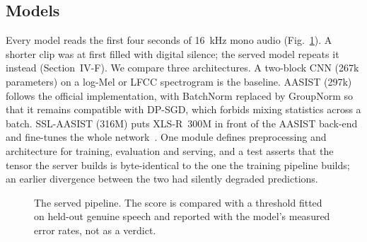 \documentclass[journal]{IEEEtran}
\begin{document}
\subsection{Models}
Every model reads the first four seconds of 16~kHz mono audio
(Fig.~\ref{fig:pipeline}). A shorter clip was at first filled with digital
silence; the served model repeats it instead (Section~IV-F). We compare three architectures. A two-block CNN
(267k parameters) on a log-Mel or LFCC spectrogram is the baseline. AASIST
(297k) follows the official implementation, with BatchNorm replaced by
GroupNorm so that it remains compatible with DP-SGD, which forbids mixing
statistics across a batch. SSL-AASIST (316M) puts XLS-R~300M in front of the
AASIST back-end and fine-tunes the whole network~\cite{tak2022ssl}. One module
defines preprocessing and architecture for training, evaluation and serving,
and a test asserts that the tensor the server builds is byte-identical to the
one the training pipeline builds; an earlier divergence between the two had
silently degraded predictions.

\begin{figure}[!t]
\centering
{}
\caption{The served pipeline. The score is compared with a threshold fitted
on held-out genuine speech and reported with the model's measured error
rates, not as a verdict.}
\label{fig:pipeline}
\end{figure}
\end{document}
